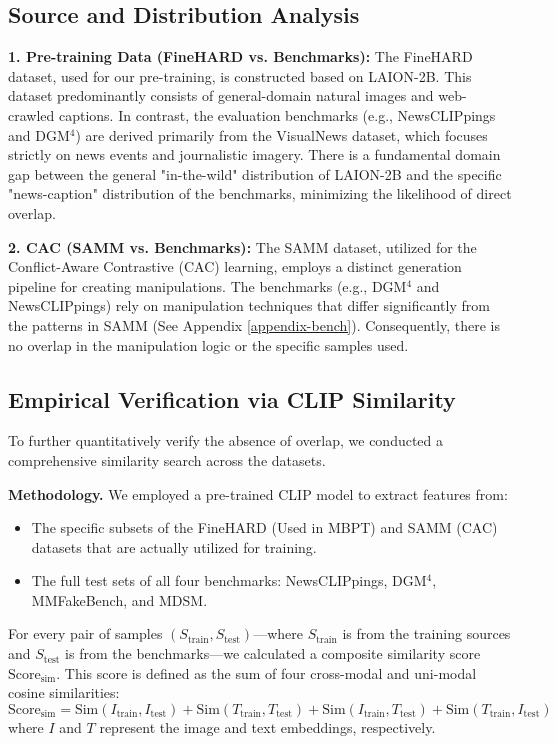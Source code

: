 \documentclass{article}
\theoremstyle{plain}
\theoremstyle{definition}
\theoremstyle{remark}
\begin{document}
\subsection{Source and Distribution Analysis}
\textbf{1. Pre-training Data (FineHARD vs. Benchmarks):} The FineHARD dataset, used for our pre-training, is constructed based on LAION-2B. This dataset predominantly consists of general-domain natural images and web-crawled captions. In contrast, the evaluation benchmarks (e.g., NewsCLIPpings and DGM$^4$) are derived primarily from the VisualNews dataset, which focuses strictly on news events and journalistic imagery. There is a fundamental domain gap between the general "in-the-wild" distribution of LAION-2B and the specific "news-caption" distribution of the benchmarks, minimizing the likelihood of direct overlap.

\textbf{2. CAC (SAMM vs. Benchmarks):} The SAMM dataset, utilized for the Conflict-Aware Contrastive (CAC) learning, employs a distinct generation pipeline for creating manipulations. The benchmarks (e.g., DGM$^4$ and NewsCLIPpings) rely on manipulation techniques that differ significantly from the patterns in SAMM (See Appendix \ref{appendix-bench}). Consequently, there is no overlap in the manipulation logic or the specific samples used.

\subsection{Empirical Verification via CLIP Similarity}
To further quantitatively verify the absence of overlap, we conducted a comprehensive similarity search across the datasets.

\textbf{Methodology.} We employed a pre-trained CLIP model to extract features from:
\begin{itemize}
    \item The specific subsets of the FineHARD (Used in MBPT) and SAMM (CAC) datasets that are actually utilized for training.
    \item The full test sets of all four benchmarks: NewsCLIPpings, DGM$^4$, MMFakeBench, and MDSM.
\end{itemize}
For every pair of samples $(S_\text{train}, S_\text{test})$—where $S_\text{train}$ is from the training sources and $S_\text{test}$ is from the benchmarks—we calculated a composite similarity score $\text{Score}_\text{sim}$. This score is defined as the sum of four cross-modal and uni-modal cosine similarities:
\begin{equation}
    \text{Score}_\text{sim} = \text{Sim}(I_\text{train}, I_\text{test}) + \text{Sim}(T_\text{train}, T_\text{test}) + \text{Sim}(I_\text{train}, T_\text{test}) + \text{Sim}(T_\text{train}, I_\text{test})
\end{equation}
where $I$ and $T$ represent the image and text embeddings, respectively.
\end{document}
